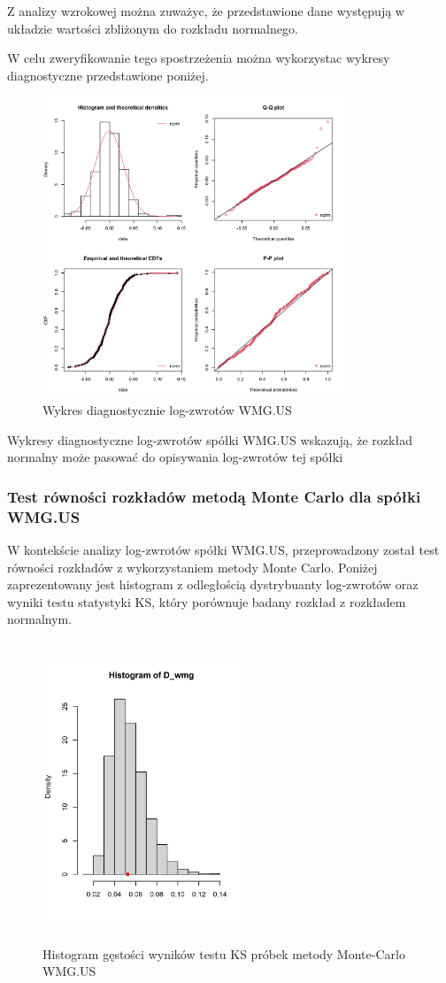 \documentclass[a4paper,11pt]{article}
\begin{document}
Z analizy wzrokowej można zuważyc, że przedstawione dane występują w układzie wartości zbliżonym do rozkładu normalnego. 

\newpage
W celu zweryfikowanie tego spostrzeżenia można wykorzystac wykresy diagnostyczne przedstawione poniżej.

\begin{figure}[h]
\centering
\includegraphics[width=9cm, height=9cm]{img/diff_wmg_wykresy_diagnostyczne.png}
\caption{Wykres diagnostycznie log-zwrotów WMG.US}
\end{figure}

Wykresy diagnostyczne log-zwrotów spółki WMG.US wskazują, że rozkład normalny może pasować do opisywania log-zwrotów tej spółki


\subsubsection{Test równości rozkładów metodą Monte Carlo dla spółki WMG.US}
W kontekście analizy log-zwrotów spółki WMG.US, przeprowadzony został test równości rozkładów z wykorzystaniem metody Monte Carlo. Poniżej zaprezentowany jest histogram z odległością dystrybuanty log-zwrotów oraz wyniki testu statystyki KS, który porównuje badany rozkład z rozkładem normalnym.

\begin{figure}[h]
\centering
\includegraphics[width=6cm, height=9cm]{img/diff_wmg_hipoteza_o_rownosci.png}
\caption{Histogram gęstości wyników testu KS próbek metody Monte-Carlo WMG.US}
\end{figure}
\end{document}
